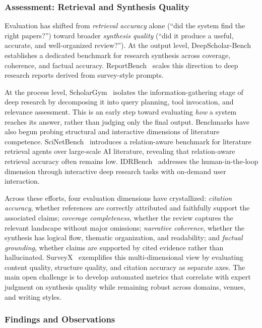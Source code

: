 \subsubsection{Assessment: Retrieval and Synthesis Quality}
\label{sec:lit_eval}

Evaluation has shifted from \emph{retrieval accuracy} alone (``did the system find the right papers?'') toward broader \emph{synthesis quality} (``did it produce a useful, accurate, and well-organized review?''). At the output level, DeepScholar-Bench~\cite{deepscholar2025} establishes a dedicated benchmark for research synthesis across coverage, coherence, and factual accuracy. ReportBench~\cite{reportbench2025} scales this direction to deep research reports derived from survey-style prompts.

At the process level, ScholarGym~\cite{scholargym2026} isolates the information-gathering stage of deep research by decomposing it into query planning, tool invocation, and relevance assessment. This is an early step toward evaluating \emph{how} a system reaches its answer, rather than judging only the final output. Benchmarks have also begun probing structural and interactive dimensions of literature competence. SciNetBench~\cite{scinetbench2026} introduces a relation-aware benchmark for literature retrieval agents over large-scale AI literature, revealing that relation-aware retrieval accuracy often remains low. IDRBench~\cite{idrbench2026} addresses the human-in-the-loop dimension through interactive deep research tasks with on-demand user interaction.

Across these efforts, four evaluation dimensions have crystallized: \emph{citation accuracy}, whether references are correctly attributed and faithfully support the associated claims; \emph{coverage completeness}, whether the review captures the relevant landscape without major omissions; \emph{narrative coherence}, whether the synthesis has logical flow, thematic organization, and readability; and \emph{factual grounding}, whether claims are supported by cited evidence rather than hallucinated. SurveyX~\cite{liang2025surveyx} exemplifies this multi-dimensional view by evaluating content quality, structure quality, and citation accuracy as separate axes. The main open challenge is to develop automated metrics that correlate with expert judgment on synthesis quality while remaining robust across domains, venues, and writing styles.



\subsubsection{Findings and Observations}
\label{sec:s2_findings}

